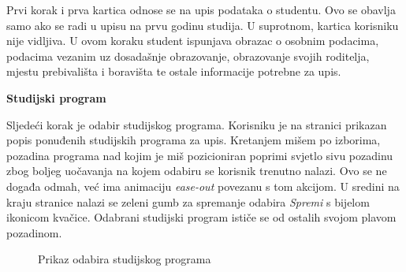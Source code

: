 \documentclass[times, utf8, zavrsni, numeric]{fer}
\begin{document}
    Prvi korak i prva kartica odnose se na upis podataka o studentu. Ovo se obavlja samo ako se radi u upisu na prvu godinu studija. U suprotnom, kartica korisniku nije vidljiva. U ovom koraku student ispunjava obrazac o osobnim podacima, podacima vezanim uz dosadašnje obrazovanje, obrazovanje svojih roditelja, mjestu prebivališta i boravišta te ostale informacije potrebne za upis.
    \vspace{\baselineskip}
    
    \noindent\textbf{Studijski program}
    
    Sljedeći korak je odabir studijskog programa. Korisniku je na stranici prikazan popis ponuđenih studijskih programa za upis. Kretanjem mišem po izborima, pozadina programa nad kojim je miš pozicioniran poprimi svjetlo sivu pozadinu zbog boljeg uočavanja na kojem odabiru se korisnik trenutno nalazi. Ovo se ne događa odmah, već ima animaciju \textit{ease-out} povezanu s tom akcijom. U sredini na kraju stranice nalazi se zeleni gumb za spremanje odabira \textit{Spremi} s bijelom ikonicom kvačice. Odabrani studijski program ističe se od ostalih svojom plavom pozadinom. 
    
    \begin{figure} [H]
      \centering
      \caption{Prikaz odabira studijskog programa}

    \end{figure}
    
\end{document}
